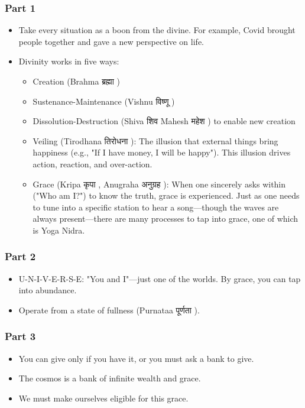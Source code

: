 \begin{frame}[fragile]\frametitle{Part 1}

\begin{itemize}
    \item Take every situation as a boon from the divine. For example, Covid brought people together and gave a new perspective on life.
    \item Divinity works in five ways:
    \begin{itemize}
        \item Creation (Brahma ब्रह्मा )
        \item Sustenance-Maintenance (Vishnu विष्णू )
        \item Dissolution-Destruction (Shiva शिव  Mahesh महेश ) to enable new creation
        \item Veiling (Tirodhana तिरोधना ): The illusion that external things bring happiness (e.g., "If I have money, I will be happy"). This illusion drives action, reaction, and over-action.
        \item Grace (Kripa कृपा , Anugraha अनुग्रह ): When one sincerely asks within ("Who am I?") to know the truth, grace is experienced. Just as one needs to tune into a specific station to hear a song—though the waves are always present—there are many processes to tap into grace, one of which is Yoga Nidra.
    \end{itemize}
\end{itemize}

\end{frame}

\begin{frame}[fragile]\frametitle{Part 2}

\begin{itemize}
    \item U-N-I-V-E-R-S-E: "You and I"—just one of the worlds. By grace, you can tap into abundance.
    \item Operate from a state of fullness (Purnataa पूर्णता ).
\end{itemize}

\end{frame}

\begin{frame}[fragile]\frametitle{Part 3}

\begin{itemize}
    \item You can give only if you have it, or you must ask a bank to give.
    \item The cosmos is a bank of infinite wealth and grace.
    \item We must make ourselves eligible for this grace.
\end{itemize}

\end{frame}

